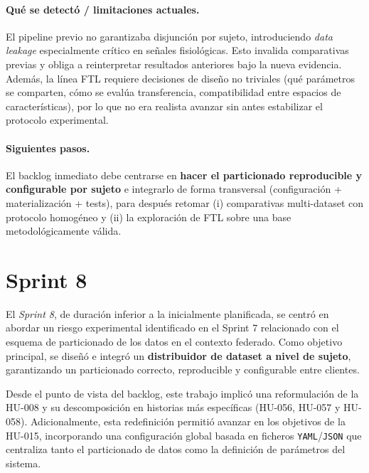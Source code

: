 \documentclass{report}
\begin{document}
\vspace{0.15em}
\paragraph{Qué se detectó / limitaciones actuales.}
El pipeline previo no garantizaba disjunción por sujeto, introduciendo \emph{data leakage} especialmente crítico en señales fisiológicas. Esto invalida comparativas previas y obliga a reinterpretar resultados anteriores bajo la nueva evidencia.
Además, la línea FTL requiere decisiones de diseño no triviales (qué parámetros se comparten, cómo se evalúa transferencia, compatibilidad entre espacios de características), por lo que no era realista avanzar sin antes estabilizar el protocolo experimental.

\vspace{0.15em}
\paragraph{Siguientes pasos.}
El backlog inmediato debe centrarse en \textbf{hacer el particionado reproducible y configurable por sujeto} e integrarlo de forma transversal (configuración + materialización + tests), para después retomar (i) comparativas multi-dataset con protocolo homogéneo y (ii) la exploración de FTL sobre una base metodológicamente válida.


\section{Sprint 8}
\label{sect:Sp8}
El \textit{Sprint 8}, de duración inferior a la inicialmente planificada, se centró en abordar un riesgo experimental identificado en el Sprint 7 relacionado con el esquema de particionado de los datos en el contexto federado. Como objetivo principal, se diseñó e integró un \textbf{distribuidor de dataset a nivel de sujeto}, garantizando un particionado correcto, reproducible y configurable entre clientes.

Desde el punto de vista del backlog, este trabajo implicó una reformulación de la HU-008 y su descomposición en historias más específicas (HU-056, HU-057 y HU-058). Adicionalmente, esta redefinición permitió avanzar en los objetivos de la HU-015, incorporando una configuración global basada en ficheros \texttt{YAML}/\texttt{JSON} que centraliza tanto el particionado de datos como la definición de parámetros del sistema.
\end{document}
